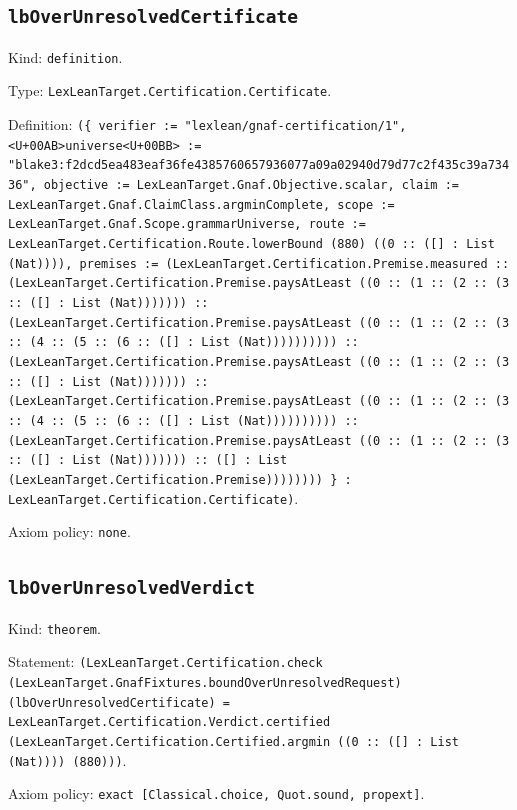 \documentclass[11pt]{article}
\begin{document}
\subsection*{\texttt{lbOverUnresolvedCertificate}}
\noindent Kind: \texttt{definition}.\par
\noindent Type: \texttt{LexLeanTarget.Certification.Certificate}.\par
\noindent Definition: \texttt{(\{ verifier := "lexlean/gnaf-certification/1", <U+00AB>universe<U+00BB> := "blake3:f2dcd5ea483eaf36fe4385760657936077a09a02940d79d77c2f435c39a73436", objective := LexLeanTarget.Gnaf.Objective.scalar, claim := LexLeanTarget.Gnaf.ClaimClass.argminComplete, scope := LexLeanTarget.Gnaf.Scope.grammarUniverse, route := LexLeanTarget.Certification.Route.lowerBound (880) ((0 :: ([] : List (Nat)))), premises := (LexLeanTarget.Certification.Premise.measured :: (LexLeanTarget.Certification.Premise.paysAtLeast ((0 :: (1 :: (2 :: (3 :: ([] : List (Nat))))))) :: (LexLeanTarget.Certification.Premise.paysAtLeast ((0 :: (1 :: (2 :: (3 :: (4 :: (5 :: (6 :: ([] : List (Nat)))))))))) :: (LexLeanTarget.Certification.Premise.paysAtLeast ((0 :: (1 :: (2 :: (3 :: ([] : List (Nat))))))) :: (LexLeanTarget.Certification.Premise.paysAtLeast ((0 :: (1 :: (2 :: (3 :: (4 :: (5 :: (6 :: ([] : List (Nat)))))))))) :: (LexLeanTarget.Certification.Premise.paysAtLeast ((0 :: (1 :: (2 :: (3 :: ([] : List (Nat))))))) :: ([] : List (LexLeanTarget.Certification.Premise)))))))) \} : LexLeanTarget.Certification.Certificate)}.\par
\noindent Axiom policy: \texttt{none}.\par
\subsection*{\texttt{lbOverUnresolvedVerdict}}
\noindent Kind: \texttt{theorem}.\par
\noindent Statement: \texttt{(LexLeanTarget.Certification.check (LexLeanTarget.GnafFixtures.boundOverUnresolvedRequest) (lbOverUnresolvedCertificate) = LexLeanTarget.Certification.Verdict.certified (LexLeanTarget.Certification.Certified.argmin ((0 :: ([] : List (Nat)))) (880)))}.\par
\noindent Axiom policy: \texttt{exact [Classical.choice, Quot.sound, propext]}.\par
\end{document}

